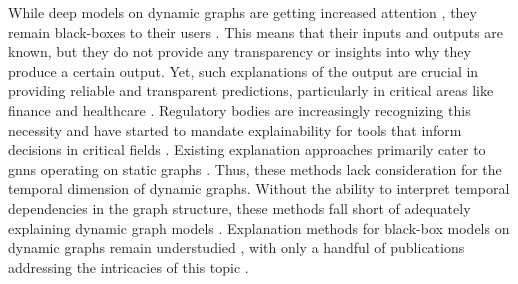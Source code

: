 While deep models on dynamic graphs are getting increased attention \cite{longa_graph_2023}, they remain black-boxes to their users \cite{vu_limit_2022}. This means that their inputs and outputs are known, but they do not provide any transparency or insights into why they produce a certain output. Yet, such explanations of the output are crucial in providing reliable and transparent predictions, particularly in critical areas like finance and healthcare \cite{prado-romero_survey_2023}. Regulatory bodies are increasingly recognizing this necessity and have started to mandate explainability for tools that inform decisions in critical fields \cite{european_parliament_proposal_2021}. Existing explanation approaches primarily cater to \glspl{gnn} operating on static graphs \cite{yuan_explainability_2020, kakkad_survey_2023}. Thus, these methods lack consideration for the temporal dimension of dynamic graphs. Without the ability to interpret temporal dependencies in the graph structure, these methods fall short of adequately explaining dynamic graph models \cite{he_explainer_2022, xia_explaining_2023, liu_differential_2023}. Explanation methods for black-box models on dynamic graphs remain understudied \cite{vu_limit_2022, longa_graph_2023}, with only a handful of publications addressing the intricacies of this topic \cite{he_explainer_2022, xia_explaining_2023, xie_explaining_2022, liu_differential_2023, fan_gcn-se_2021}.

